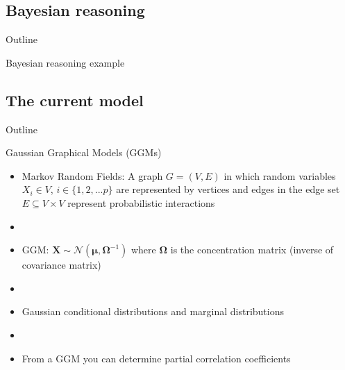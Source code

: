 \documentclass[xcolor=dvipsnames]{beamer}
\begin{document}
\subsection{Bayesian reasoning}
\begin{frame}{Outline}
	\vspace{-10.5pt}
	\tableofcontents[currentsection,subsectionstyle=show/shaded/hide]
\end{frame}

\begin{frame}{Bayesian reasoning example}
	\vspace{-5pt}
	\begin{center}
	\end{center}
\end{frame}

\subsection{The current model}
\begin{frame}{Outline}
	\vspace{-10.5pt}
	\tableofcontents[currentsection,subsectionstyle=show/shaded/hide]
\end{frame}

\begin{frame}{Gaussian Graphical Models (GGMs)}
	\vspace{-5.5pt}
	\begin{itemize}
		\item Markov Random Fields: A graph $G=(V,E)$ in which random variables $X_i\in V$, $i\in \{1,2,...p\}$ are represented by vertices and edges in the edge set $E \subseteq V \times V$ represent probabilistic interactions
		\item[]
		\item GGM: $\textbf{X}\sim \mathcal{N}(\boldsymbol{\mu},\boldsymbol{\Omega}^{-1})$ where $\boldsymbol{\Omega}$ is the concentration matrix (inverse of covariance matrix)
		\item[]
		\item Gaussian conditional distributions and marginal distributions
		\item[]
		\item From a GGM you can determine partial correlation coefficients 
	\end{itemize}
\end{frame}
\end{document}
